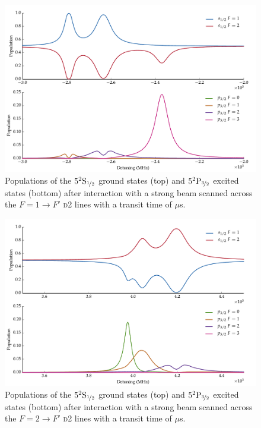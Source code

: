     \begin{figure}[]
    \includegraphics[width=\linewidth]{figs/05_twophoton/rb87_d2_hf_solve_scan_h2a_fig1.pdf}
    \caption{
    Populations of the $5^2\rm{S}_{\nicefrac{1}{2}}$ ground states (top) and
    $5^2\rm{P}_{\nicefrac{3}{2}}$ excited states (bottom)  after interaction
    with a strong beam  scanned across the  $F = 1 \rightarrow F'$ \textsc{d2}
    lines with a transit time of \unit[2]{$\mu$s}.
    }
    \label{fig:strong_d2_f2} 
    \end{figure}

    \begin{figure}[]
    \includegraphics[width=\linewidth]{figs/05_twophoton/rb87_d2_hf_solve_scan_g3a_fig1.pdf}
    \caption{
    Populations of the $5^2\rm{S}_{\nicefrac{1}{2}}$ ground states (top) and
    $5^2\rm{P}_{\nicefrac{3}{2}}$ excited states (bottom)  after interaction
    with a strong beam scanned across the  $F = 2 \rightarrow F'$ \textsc{d2}
    lines with a transit time of \unit[2]{$\mu$s}.
    }
    \label{fig:strong_d2_f1} 
    \end{figure}

